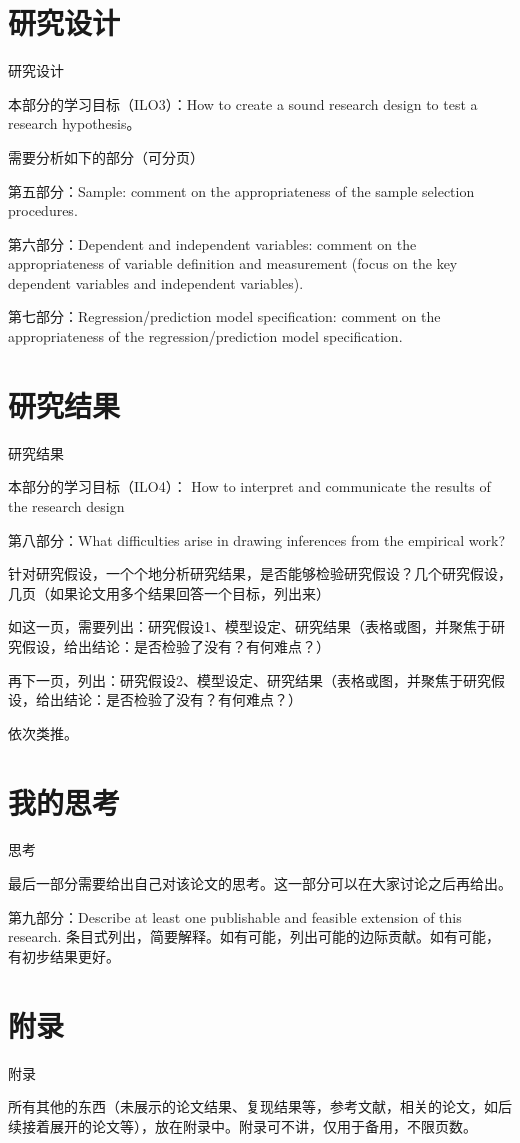 \documentclass[10pt,aspectratio=169,compress,ignorenonframetext]{beamer}
\begin{document}
\section{研究设计}

\begin{frame}{研究设计}

本部分的学习目标（ILO3）：How to create a sound research design to test a research hypothesis。

需要分析如下的部分（可分页）

第五部分：Sample: comment on the appropriateness of the sample selection procedures.

第六部分：Dependent and independent variables: comment on the appropriateness of variable definition and measurement (focus on the key dependent variables and independent variables).

第七部分：Regression/prediction model specification: comment on the appropriateness of the regression/prediction model specification.

\end{frame}

\section{研究结果}

\begin{frame}{研究结果}

本部分的学习目标（ILO4）： How to interpret and communicate the results of the research design

第八部分：What difficulties arise in drawing inferences from the empirical work?


针对研究假设，一个个地分析研究结果，是否能够检验研究假设？几个研究假设，几页（如果论文用多个结果回答一个目标，列出来）

 如这一页，需要列出：研究假设1、模型设定、研究结果（表格或图，并聚焦于研究假设，给出结论：是否检验了没有？有何难点？）
 
 再下一页，列出：研究假设2、模型设定、研究结果（表格或图，并聚焦于研究假设，给出结论：是否检验了没有？有何难点？）

依次类推。


\end{frame}

\section{我的思考}

\begin{frame}{思考}

最后一部分需要给出自己对该论文的思考。这一部分可以在大家讨论之后再给出。

第九部分：Describe at least one publishable and feasible extension of this research. 条目式列出，简要解释。如有可能，列出可能的边际贡献。如有可能，有初步结果更好。

\end{frame}

\section*{附录}

\begin{frame}{附录}

所有其他的东西（未展示的论文结果、复现结果等，参考文献，相关的论文，如后续接着展开的论文等），放在附录中。附录可不讲，仅用于备用，不限页数。

\end{frame}
\end{document}
